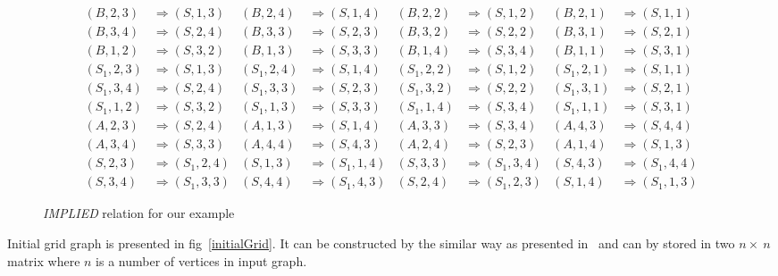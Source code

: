 \begin{centering}
\begin{figure*}
\begin{align*} %
(B,2,3)  & \Rightarrow (S,1,3)  & (B,2,4)  & \Rightarrow (S,1,4)  & (B,2,2)  & \Rightarrow (S,1,2) & (B,2,1)  & \Rightarrow (S,1,1)
\\
(B,3,4)  & \Rightarrow (S,2,4)  & (B,3,3)  & \Rightarrow (S,2,3)  & (B,3,2)  & \Rightarrow (S,2,2) & (B,3,1)  & \Rightarrow (S,2,1)
\\
(B,1,2)  & \Rightarrow (S,3,2)  & (B,1,3)  & \Rightarrow (S,3,3)  & (B,1,4)  & \Rightarrow (S,3,4) & (B,1,1)  & \Rightarrow (S,3,1)
\\ %
(S_1,2,3)  & \Rightarrow (S,1,3) & (S_1,2,4)  & \Rightarrow (S,1,4) & (S_1,2,2)  & \Rightarrow (S,1,2) & (S_1,2,1)  & \Rightarrow (S,1,1)
\\
(S_1,3,4)  & \Rightarrow (S,2,4)  & (S_1,3,3)  & \Rightarrow (S,2,3)  & (S_1,3,2)  & \Rightarrow (S,2,2) & (S_1,3,1)  & \Rightarrow (S,2,1)
\\
(S_1,1,2)  & \Rightarrow (S,3,2)  &  (S_1,1,3) & \Rightarrow (S,3,3)  & (S_1,1,4)  & \Rightarrow (S,3,4)  & (S_1,1,1)  & \Rightarrow (S,3,1)
\\ %
(A,2,3)  & \Rightarrow (S,2,4)    &  (A,1,3) & \Rightarrow (S,1,4)    & (A,3,3)  & \Rightarrow (S,3,4)    & (A,4,3)  & \Rightarrow (S,4,4)
\\
(A,3,4)  & \Rightarrow (S,3,3)    &  (A,4,4) & \Rightarrow (S,4,3)    & (A,2,4)  & \Rightarrow (S,2,3)    & (A,1,4)  & \Rightarrow (S,1,3)
\\ %
(S,2,3)  & \Rightarrow (S_1,2,4)  &  (S,1,3) & \Rightarrow (S_1,1,4)  & (S,3,3)  & \Rightarrow (S_1,3,4)  & (S,4,3)  & \Rightarrow (S_1,4,4)
\\
(S,3,4)  & \Rightarrow (S_1,3,3)  &  (S,4,4) & \Rightarrow (S_1,4,3)  & (S,2,4)  & \Rightarrow (S_1,2,3)  & (S,1,4)  & \Rightarrow (S_1,1,3)
\end{align*}

\caption{\emph{IMPLIED} relation for our example}
\label{implied}
\end{figure*}
\end{centering}

Initial grid graph is presented in fig~\ref{initialGrid}.
It can be constructed by the similar way as presented in~\cite{Rytter} and can by stored in two $n \times \ n$ matrix where $n$ is a number of vertices in input graph.

